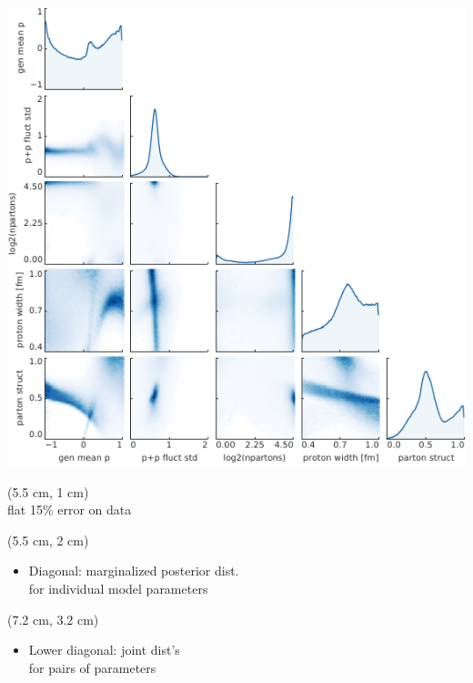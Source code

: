 \documentclass[aspectratio=43]{beamer}
\theoremstyle{definition}
\begin{document}
\begin{frame}[plain]
  \centering
  \includegraphics[width=.95\textheight]{posterior}
  \begin{textblock*}{0.6\paperwidth}(5.5 cm, 1 cm)
    {\Large \color{theme}{Posterior distribution}} \\
    \small flat 15\% error on data \\
  \end{textblock*}
  \begin{textblock*}{0.6\paperwidth}(5.5 cm, 2 cm)
    \begin{itemize}
      \item Diagonal: marginalized posterior dist.\\for individual model parameters
    \end{itemize}
  \end{textblock*}
  \begin{textblock*}{0.6\paperwidth}(7.2 cm, 3.2 cm)
    \begin{itemize}
      \item Lower diagonal: joint dist's\\for pairs of parameters
    \end{itemize}
  \end{textblock*}
\end{frame}
\end{document}
